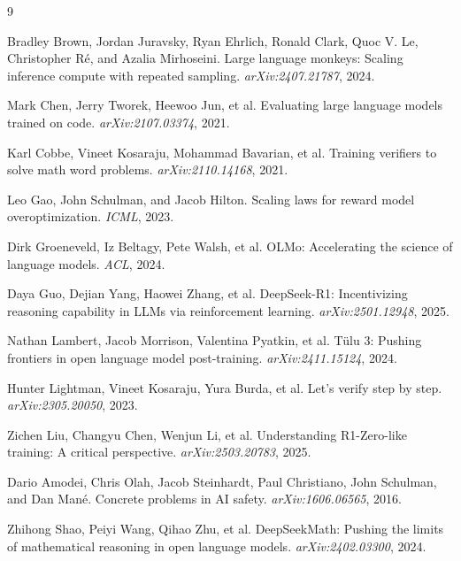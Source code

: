 \documentclass{article}
\begin{document}
\begin{thebibliography}{9}

Bradley Brown, Jordan Juravsky, Ryan Ehrlich, Ronald Clark, Quoc V. Le, Christopher R\'e, and Azalia Mirhoseini.
\newblock Large language monkeys: Scaling inference compute with repeated sampling.
\newblock \emph{arXiv:2407.21787}, 2024.

Mark Chen, Jerry Tworek, Heewoo Jun, et al.
\newblock Evaluating large language models trained on code.
\newblock \emph{arXiv:2107.03374}, 2021.

Karl Cobbe, Vineet Kosaraju, Mohammad Bavarian, et al.
\newblock Training verifiers to solve math word problems.
\newblock \emph{arXiv:2110.14168}, 2021.

Leo Gao, John Schulman, and Jacob Hilton.
\newblock Scaling laws for reward model overoptimization.
\newblock \emph{ICML}, 2023.

Dirk Groeneveld, Iz Beltagy, Pete Walsh, et al.
\newblock OLMo: Accelerating the science of language models.
\newblock \emph{ACL}, 2024.

Daya Guo, Dejian Yang, Haowei Zhang, et al.
\newblock DeepSeek-R1: Incentivizing reasoning capability in LLMs via reinforcement learning.
\newblock \emph{arXiv:2501.12948}, 2025.

Nathan Lambert, Jacob Morrison, Valentina Pyatkin, et al.
\newblock T\"ulu 3: Pushing frontiers in open language model post-training.
\newblock \emph{arXiv:2411.15124}, 2024.

Hunter Lightman, Vineet Kosaraju, Yura Burda, et al.
\newblock Let's verify step by step.
\newblock \emph{arXiv:2305.20050}, 2023.

Zichen Liu, Changyu Chen, Wenjun Li, et al.
\newblock Understanding R1-Zero-like training: A critical perspective.
\newblock \emph{arXiv:2503.20783}, 2025.

Dario Amodei, Chris Olah, Jacob Steinhardt, Paul Christiano, John Schulman, and Dan Man\'e.
\newblock Concrete problems in AI safety.
\newblock \emph{arXiv:1606.06565}, 2016.

Zhihong Shao, Peiyi Wang, Qihao Zhu, et al.
\newblock DeepSeekMath: Pushing the limits of mathematical reasoning in open language models.
\newblock \emph{arXiv:2402.03300}, 2024.


\end{thebibliography}
\end{document}
